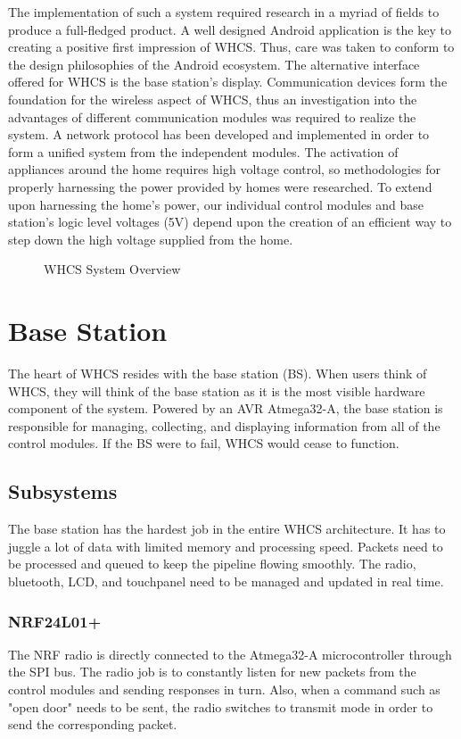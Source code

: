 \documentclass[draft,twocolumn,letterpaper,10pt]{IEEEtran}
\newcommand{\ucffig}[3]{
\begin{figure}[h]
\centering
\makebox[\linewidth][c]{
#2
}
\caption{#3}
\label{#1}
\end{figure}
}
\newcommand{\ucfgfx}[4][scale=1.0]{
\ucffig{#2}{\texttt{[image: \#3]}}{#4}
}
\begin{document}
The implementation of such a system required research in a myriad of fields to
produce a full{}-fledged product. A well designed Android application is the key to
creating a positive first impression of WHCS. Thus, care was taken to
conform to the design philosophies of the Android ecosystem. The alternative
interface offered for WHCS is the base station{}'s display. Communication
devices form the foundation for the wireless aspect of WHCS, thus an
investigation into the advantages of different communication modules was
required to realize the system. A network protocol has been developed
and implemented in order to form a unified system from the independent modules.
The activation of appliances around the home requires high voltage control, so
methodologies for properly harnessing the power provided by homes were researched.
To extend upon harnessing the home{}'s power, our individual
control modules and base station{}'s logic level voltages (5V) depend upon the
creation of an efficient way to step down the high voltage supplied from the
home.

\ucfgfx[width=\linewidth]{fig:whcs-overview}{a21expected2pages-img001.png}{WHCS System Overview}

\section{Base Station}
The heart of WHCS resides with the base station (BS). When users think of WHCS, they
will think of the base station as it is the most visible hardware component of the system.
Powered by an AVR Atmega32-A, the base station is responsible for managing, collecting, and displaying
information from all of the control modules. If the BS were to fail, WHCS
would cease to function.

\subsection{Subsystems}
The base station has the hardest job in the entire WHCS architecture. It has to
juggle a lot of data with limited memory and processing speed. Packets need to be
processed and queued to keep the pipeline flowing smoothly. The radio,
bluetooth, LCD, and touchpanel need to be managed and updated in real time.

\subsubsection{NRF24L01+}
The NRF radio is directly connected to the Atmega32-A microcontroller
through the SPI bus. The radio job is to constantly listen for new
packets from the control modules and sending responses in turn. 
Also, when a command such as "open door" needs to be sent, the radio
switches to transmit mode in order to send the corresponding packet.
\end{document}
